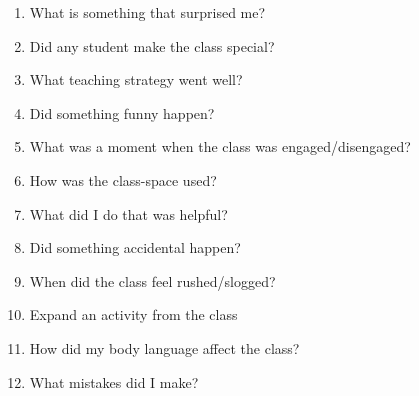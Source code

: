   \begin{enumerate}
    \item What is something that surprised me?
    \item Did any student make the class special?
    \item What teaching strategy went well?
    \item Did something funny happen?
    \item What was a moment when the class was engaged/disengaged?
    \item How was the class-space used?
    \item What did I do that was helpful?
    \item Did something accidental happen?
    \item When did the class feel rushed/slogged?
    \item Expand an activity from the class
    \item How did my body language affect the class?
    \item What mistakes did I make?
  \end{enumerate}
